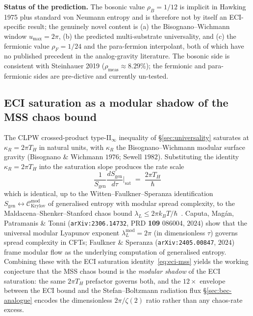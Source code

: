 \documentclass[reprint,amsmath,amssymb,aps,prd,superscriptaddress]{revtex4-2}
\providecommand{\1}{\mathbf{1}}
\begin{document}
\smallskip
\noindent\textbf{Status of the prediction.} The bosonic value $\rho_B = 1/12$ is implicit in
Hawking 1975 plus standard von Neumann entropy and is therefore not by itself an ECI-specific
result; the genuinely novel content is (a) the Bisognano--Wichmann window $u_\mathrm{max}=2\pi$,
(b) the predicted multi-substrate universality, and (c) the fermionic value $\rho_F = 1/24$ and
the para-fermion interpolant, both of which have no published precedent in the analog-gravity
literature. The bosonic side is consistent with Steinhauer 2019 ($\rho_\mathrm{meas}\approx 8.29\%$);
the fermionic and para-fermionic sides are pre-dictive and currently un-tested.

\subsection{ECI saturation as a modular shadow of the MSS chaos bound}\label{sec:mss-shadow}

The CLPW crossed-product type-II$_\infty$ inequality of \S\ref{sec:universality}
saturates at $\kappa_R = 2\pi T_H$ in natural units, with $\kappa_R$ the Bisognano--Wichmann
modular surface gravity (Bisognano \& Wichmann $1976$; Sewell $1982$). Substituting the
identity $\kappa_R = 2\pi T_H$ into the saturation slope produces the rate scale
\begin{equation}
\boxed{\quad \frac{1}{S_\mathrm{gen}} \frac{dS_\mathrm{gen}}{d\tau}\Bigg|_\mathrm{sat}
\;=\; \frac{2\pi T_H}{\hbar} \quad}
\label{eq:eci-mss}
\end{equation}
which is identical, up to the Witten--Faulkner--Speranza identification
$S_\mathrm{gen} \leftrightarrow \mathcal{C}_\mathrm{Krylov}^\mathrm{mod}$ of generalised
entropy with modular spread complexity, to the Maldacena--Shenker--Stanford chaos bound
$\lambda_L \le 2\pi k_B T/\hbar$~\cite{MSS2015}. Caputa, Mag\'an, Patramanis \& Tonni
(\texttt{arXiv:2306.14732}, PRD \textbf{109} 086004, $2024$) show that the universal
modular Lyapunov exponent $\lambda_L^\mathrm{mod} = 2\pi$ (in dimensionless $\tau$) governs
spread complexity in CFTs; Faulkner \& Speranza (\texttt{arXiv:2405.00847}, $2024$) frame
modular flow as the underlying computation of generalised entropy. Combining these with
the ECI saturation identity~\eqref{eq:eci-mss} yields the working conjecture that the
MSS chaos bound is the \emph{modular shadow} of the ECI saturation: the same $2\pi T_H$
prefactor governs both, and the $12\!\times$ envelope between the ECI bound and the
Stefan--Boltzmann radiation flux \S\ref{sec:bec-analogue} encodes the dimensionless
$2\pi/\zeta(2)$ ratio rather than any chaos-rate excess.
\end{document}
